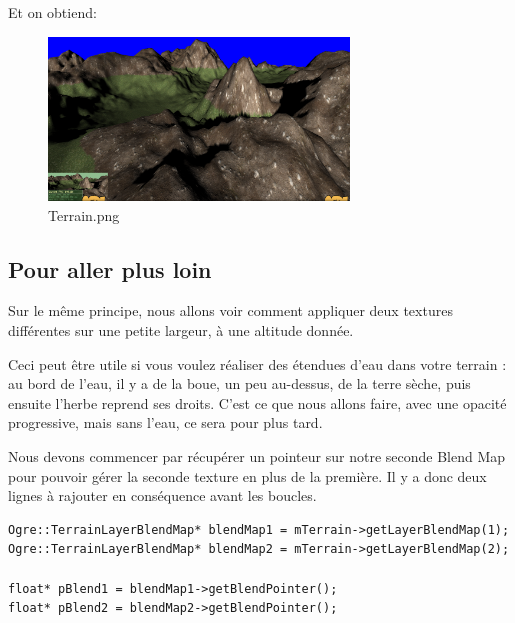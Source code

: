Et on obtiend:
\begin{figure}[hbtp]
\caption{Terrain.png}
\centering
\includegraphics[width=8cm]{Ogre/1_Base_de_Ogre/5_Garder_les_pieds_sur_terre/images/Differentes_textures_selon_altitude1.png} %
\end{figure}




















\subsection{Pour aller plus loin}


Sur le même principe, nous allons voir comment appliquer deux textures différentes sur une petite largeur, à une altitude donnée.

Ceci peut être utile si vous voulez réaliser des étendues d'eau dans votre terrain : au bord de l'eau, il y a de la boue, un peu au-dessus, de la terre sèche, puis ensuite l'herbe reprend ses droits. C'est ce que nous allons faire, avec une opacité progressive, mais sans l'eau, ce sera pour plus tard.

Nous devons commencer par récupérer un pointeur sur notre seconde Blend Map pour pouvoir gérer la seconde texture en plus de la première. Il y a donc deux lignes à rajouter en conséquence avant les boucles.




\begin{lstlisting}[caption={Récupération des Blend Map pour le premier et le second terrain}]
Ogre::TerrainLayerBlendMap* blendMap1 = mTerrain->getLayerBlendMap(1);
Ogre::TerrainLayerBlendMap* blendMap2 = mTerrain->getLayerBlendMap(2);

float* pBlend1 = blendMap1->getBlendPointer();
float* pBlend2 = blendMap2->getBlendPointer();
\end{lstlisting}

